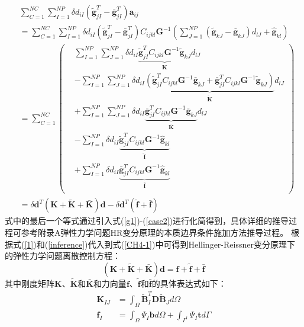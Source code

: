 \begin{equation}\label{inference}
\begin{split}
    &\sum_{C=1}^{N\!C}\sum_{I=1}^{N\!P}\delta d_{iI}(\tilde{\pmb g}_{jI}^T-\bar{\pmb g}_{jI}^T)\pmb{a}_{ij}\\
    &=\sum_{C=1}^{N\!C}\sum_{I=1}^{N\!P}\delta d_{iI}(\tilde{\pmb g}_{jI}^T-\bar{\pmb g}_{jI}^T)C_{ijkl}\pmb{G}^{-1}(\sum_{J=1}^{N\!P}(\tilde{\pmb g}_{kJ}-\bar{\pmb g}_{kJ})d_{lJ}+\hat{\pmb g}_{kl})\\
    &=\sum_{C=1}^{N\!C}
    \left(\begin{split}
    &\sum_{I=1}^{N\!P}\sum_{J=1}^{N\!P}\delta d_{iI}\underbrace{\tilde{\pmb g}^T_{jI}C_{ijkl}\pmb{G}^{-1}\tilde{\pmb g}_{kJ}}_{\pmb{K}}d_{lJ}\\
    &-\sum_{I=1}^{N\!P}\sum_{J=1}^{N\!P}\delta d_{iI}\underbrace{(\tilde{\pmb g}^T_{jI}C_{ijkl}\pmb{G}^{-1}\bar{\pmb g}_{kJ}
    +\bar{\pmb g}^T_{jI}C_{ijkl}\pmb{G}^{-1}\tilde{\pmb g}_{kJ})}_{\tilde{\pmb K}}d_{lJ}\\
    &+\sum_{I=1}^{N\!P}\sum_{J=1}^{N\!P}\delta d_{iI}\underbrace{\bar{\pmb g}^T_{jI}C_{ijkl}\pmb{G}^{-1}\bar{\pmb g}_{kJ}}_{\bar{\pmb K}}d_{lJ}\\
    &-\sum_{I=1}^{N\!P}\delta d_{iI}\underbrace{\tilde{\pmb g}_{jI}^TC_{ijkl}\pmb{G}^{-1}\hat{\pmb g}_{kl}}_{\tilde{\pmb f}}\\
    &+\sum_{I=1}^{N\!P}\delta d_{iI}\underbrace{\bar{\pmb g}_{jI}^TC_{ijkl}\pmb{G}^{-1}\hat{\pmb g}_{kl}}_{\bar{\pmb f}}\\
    \end{split}
    \right)\\
    &=\delta\pmb{d}^T(\pmb K+\tilde{\pmb K}+\bar{\pmb K})\pmb{d}-\delta\pmb{d}^T(\tilde{\pmb f}+\bar{\pmb f})
\end{split}
\end{equation}
式中的最后一个等式通过引入式(\ref{g1})-(\ref{case2})进行化简得到，具体详细的推导过程可参考附录A弹性力学问题HR变分原理的本质边界条件施加方法推导过程。
根据式(\ref{1})和(\ref{inference})代入到式(\ref{CH4-1})中可得到Hellinger-Reissner变分原理下的弹性力学问题离散控制方程：
\begin{equation}\label{equationE}
    (\pmb{K}+\pmb{\tilde{K}}+\pmb{\bar{K}})\pmb{d}=\pmb{f}+\tilde{\pmb{f}}+\bar{\pmb{f}}
\end{equation}
其中刚度矩阵$\pmb K$、$\tilde{\pmb K}$和$\bar{\pmb K}$和力向量$\pmb f$、$\tilde{\pmb f}$和$\bar{\pmb f}$的具体表达式如下：
\begin{subequations}\label{Ehr1}
\begin{align}    
    \label{Ehr11}   \pmb{K}_{IJ}&=\int_{\Omega}\tilde{\pmb{B}}_I^T\pmb{D}\tilde{\pmb{B}}_Jd\Omega\\
    \label{Ehr12}   \pmb f_I&=\int_{\Omega}\Psi_I\pmb{b}d\Omega+\int_{\Gamma^t}\Psi_I\pmb{t}d\Gamma
\end{align}
\end{subequations}
